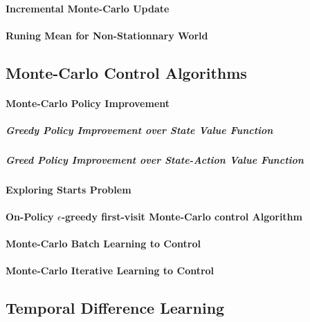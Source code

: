 		\paragraph*{Incremental Monte-Carlo Update}

		\paragraph*{Runing Mean for Non-Stationnary World}

	\subsection{Monte-Carlo Control Algorithms} %
		\label{sub:monte_carlo_control_algorithms}
	
		\paragraph*{Monte-Carlo Policy Improvement}

			\subparagraph*{Greedy Policy Improvement over State Value Function}

			\subparagraph*{Greed Policy Improvement over State-Action Value Function}

		\paragraph*{Exploring Starts Problem}

		\paragraph*{On-Policy $\epsilon$-greedy first-visit Monte-Carlo control Algorithm}

		\paragraph*{Monte-Carlo Batch Learning to Control}

		\paragraph*{Monte-Carlo Iterative Learning to Control}

	\subsection{Temporal Difference Learning} %
		\label{sub:temporal_difference_learning}
		
